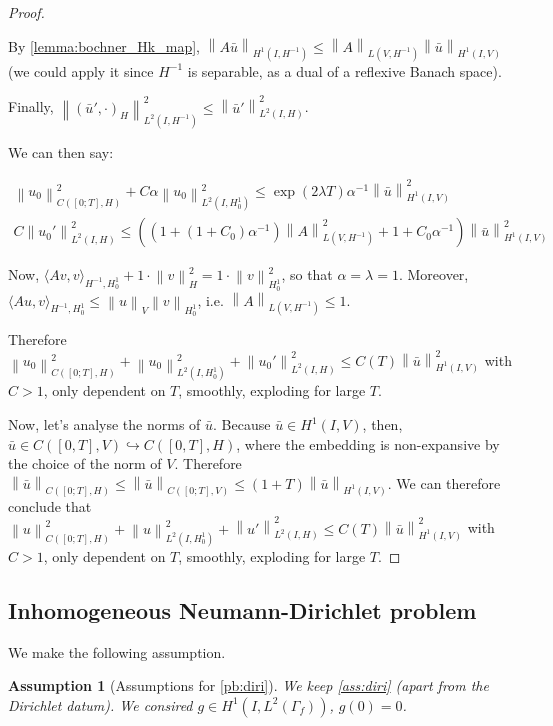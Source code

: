 \documentclass[english,a4paper,9pt,oneside]{scrbook}	%
\theoremstyle{break}
\newtheorem{ass}[equation]{Assumption}
\newenvironment{mproof}[1][\proofname]{%
  \begin{proof}[#1]$ $\par\nobreak\ignorespaces
}{%
  \end{proof}
}
\renewcommand*{\proofname}{Proof}
\theoremstyle{remark}
\newcommand{\norm}[1]{\left\lVert#1\right\rVert}
\newcommand{\HN}[1]{\norm{#1}_{H}}
\newcommand{\VN}[1]{\norm{#1}_{V}}
\newcommand{\emb}{\hookrightarrow}
\begin{document}
\begin{appendices}
\begin{mproof}
By \cref{lemma:bochner_Hk_map}, $\norm{A \bar{u}}_{H^1(I, H^{-1})}\leq \norm{A}_{L(V,H^{-1})}\norm{\bar{u}}_{H^1(I,V)}$ (we could apply it since $H^{-1}$ is separable, as a dual of a reflexive Banach space).

Finally, $\norm{(\bar{u}',\cdot)_H}^2_{L^2(I,H^{-1})}\leq \norm{\bar{u}'}_{L^2(I,H)}^2$.

We can then say:

\begin{align*}
\norm{u_0}^2_{C([0;T],H)}+C\alpha\norm{u_0}_{L^2(I,H^1_0)}^2\leq \exp(2\lambda T)\alpha^{-1}\norm{\bar{u}}^2_{H^1(I,V)}\\
C\norm{u_0'}^2_{L^2(I,H)}\leq 
((1+(1+C_0)\alpha^{-1})\norm{A}_{L(V,H^{-1})}^2 +1 +C_0\alpha^{-1})\norm{\bar{u}}^2_{H^1(I,V)}
\end{align*}

Now, $\langle Av, v\rangle_{H^{-1}, H^1_0} + 1\cdot  \HN{v}^2 = 1\cdot \norm{v}_{H^1_0}^2$, so that $\alpha=\lambda=1$. Moreover, $\langle Au, v\rangle_{H^{-1}, H^1_0}\leq \VN{u}\norm{v}_{H^1_0}$, i.e. $\norm{A}_{L(V,H^{-1})}\leq 1$.

Therefore $\norm{u_0}^2_{C([0;T],H)}+\norm{u_0}_{L^2(I,H^1_0)}^2 + \norm{u_0'}^2_{L^2(I,H)}\leq C(T)\norm{\bar{u}}_{H^1(I,V)}^2$ with $C>1$, only dependent on $T$, smoothly, exploding for large $T$.

Now, let's analyse the norms of $\bar{u}$. Because $\bar{u}\in H^1(I,V)$, then, $\bar{u} \in C([0,T],V)\emb C([0,T],H)$, where the embedding is non-expansive by the choice of the norm of $V$. Therefore $\norm{\bar{u}}_{C([0;T],H)}\leq \norm{\bar{u}}_{C([0;T],V)}\leq (1+T)\norm{\bar{u}}_{H^1(I,V)}$. We can therefore conclude that $\norm{u}^2_{C([0;T],H)}+\norm{u}_{L^2(I,H^1_0)}^2 + \norm{u'}^2_{L^2(I,H)}\leq C(T)\norm{\bar{u}}_{H^1(I,V)}^2$ with $C>1$, only dependent on $T$, smoothly, exploding for large $T$.

\end{mproof}

\subsection{Inhomogeneous Neumann-Dirichlet problem}

We make the following assumption.

\begin{ass}[Assumptions for \cref{pb:diri}]
\label{ass:neu}
We keep \cref{ass:diri} (apart from the Dirichlet datum). We consired $g \in H^1(I, L^2(\Gamma_f))$, $g(0)=0$.
\end{ass}


\end{appendices}
\end{document}
